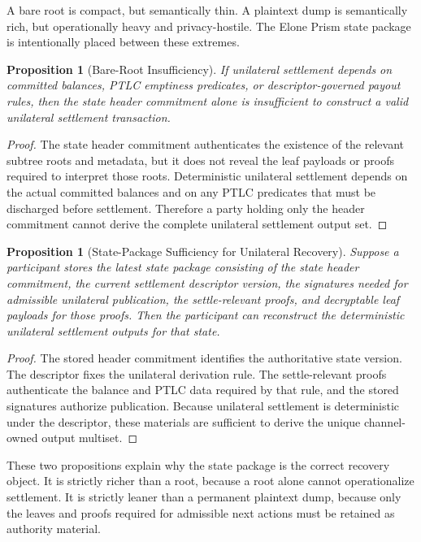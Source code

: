 \documentclass[11pt,a4paper]{article}
\newtheorem{proposition}[theorem]{Proposition}
\begin{document}
A bare root is compact, but semantically thin. A plaintext dump is semantically rich, but operationally heavy and privacy-hostile. The Elone Prism state package is intentionally placed between these extremes.

\begin{proposition}[Bare-Root Insufficiency]
If unilateral settlement depends on committed balances, PTLC emptiness predicates, or descriptor-governed payout rules, then the state header commitment alone is insufficient to construct a valid unilateral settlement transaction.
\end{proposition}

\begin{proof}
The state header commitment authenticates the existence of the relevant subtree roots and metadata, but it does not reveal the leaf payloads or proofs required to interpret those roots. Deterministic unilateral settlement depends on the actual committed balances and on any PTLC predicates that must be discharged before settlement. Therefore a party holding only the header commitment cannot derive the complete unilateral settlement output set.
\end{proof}

\begin{proposition}[State-Package Sufficiency for Unilateral Recovery]
Suppose a participant stores the latest state package consisting of the state header commitment, the current settlement descriptor version, the signatures needed for admissible unilateral publication, the settle-relevant proofs, and decryptable leaf payloads for those proofs. Then the participant can reconstruct the deterministic unilateral settlement outputs for that state.
\end{proposition}

\begin{proof}
The stored header commitment identifies the authoritative state version. The descriptor fixes the unilateral derivation rule. The settle-relevant proofs authenticate the balance and PTLC data required by that rule, and the stored signatures authorize publication. Because unilateral settlement is deterministic under the descriptor, these materials are sufficient to derive the unique channel-owned output multiset.
\end{proof}

These two propositions explain why the state package is the correct recovery object. It is strictly richer than a root, because a root alone cannot operationalize settlement. It is strictly leaner than a permanent plaintext dump, because only the leaves and proofs required for admissible next actions must be retained as authority material.
\end{document}
